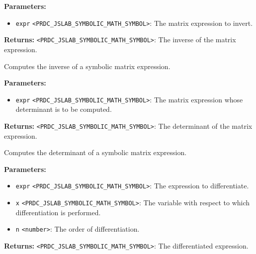 \documentclass[12pt,a4paper]{article}
\begin{document}
\vspace{5mm}
\noindent {}


\noindent \textbf{Parameters:}
\begin{itemize}
  \item \texttt{expr} \texttt{<PRDC\_JSLAB\_SYMBOLIC\_MATH\_SYMBOL>}: The matrix expression to invert.
\end{itemize}

\noindent \textbf{Returns:} \texttt{<PRDC\_JSLAB\_SYMBOLIC\_MATH\_SYMBOL>}: The inverse of the matrix expression.

\noindent Computes the inverse of a symbolic matrix expression.

\vspace{5mm}
\noindent {}


\noindent \textbf{Parameters:}
\begin{itemize}
  \item \texttt{expr} \texttt{<PRDC\_JSLAB\_SYMBOLIC\_MATH\_SYMBOL>}: The matrix expression whose determinant is to be computed.
\end{itemize}

\noindent \textbf{Returns:} \texttt{<PRDC\_JSLAB\_SYMBOLIC\_MATH\_SYMBOL>}: The determinant of the matrix expression.

\noindent Computes the determinant of a symbolic matrix expression.

\vspace{5mm}
\noindent {}


\noindent \textbf{Parameters:}
\begin{itemize}
  \item \texttt{expr} \texttt{<PRDC\_JSLAB\_SYMBOLIC\_MATH\_SYMBOL>}: The expression to differentiate.
  \item \texttt{x} \texttt{<PRDC\_JSLAB\_SYMBOLIC\_MATH\_SYMBOL>}: The variable with respect to which differentiation is performed.
  \item \texttt{n} \texttt{<number>}: The order of differentiation.
\end{itemize}

\noindent \textbf{Returns:} \texttt{<PRDC\_JSLAB\_SYMBOLIC\_MATH\_SYMBOL>}: The differentiated expression.
\end{document}
